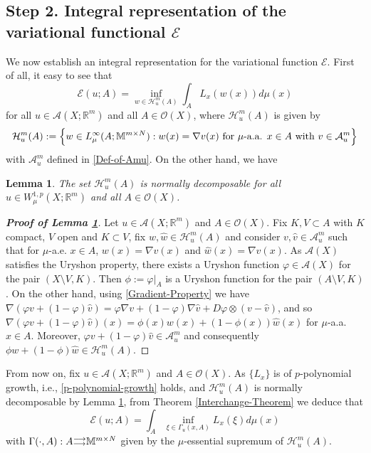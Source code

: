 \documentclass[10pt]{amsart}
\numberwithin{equation}{section}
\newtheorem{lemma}[theorem]{Lemma}
\theoremstyle{definition}
\theoremstyle{remark}
\begin{document}
\subsection*{Step 2. Integral representation of the variational functional \boldmath$\mathcal{E}$\unboldmath} We now establish an integral representation for the variational function $\mathcal{E}$. First of all, it easy to see that
$$
\mathcal{E}(u;A)=\inf_{w\in\mathcal{H}^m_u(A)}\int_AL_x(w(x))d\mu(x)
$$
for all $u\in \mathcal{A}(X;{{\mathbb R}}^m)$ and all $A\in\mathcal{O}(X)$, where $\mathcal{H}^m_u(A)$ is given by
$$
\mathcal{H}^m_u(A):=\Big\{w\in L^\infty_\mu(A;{{\mathbb M}^{m\times N}}):w(x)=\nabla v(x)\hbox{ for $\mu$-a.a. }x\in A\hbox{ with }v\in\mathcal{A}^m_u\Big\}
$$
with $\mathcal{A}^m_u$ defined in \eqref{Def-of-Amu}. On the other hand, we have
\begin{lemma}\label{Lemma2-Prop}
The set $\mathcal{H}^m_u(A)$ is normally decomposable for all $u\in W^{1,p}_\mu(X;{{\mathbb R}}^m)$ and all $A\in\mathcal{O}(X)$.
\end{lemma}
\begin{proof}[\bf Proof of Lemma \ref{Lemma2-Prop}]
Let $u\in\mathcal{A}(X;{{\mathbb R}}^m)$ and $A\in\mathcal{O}(X)$. Fix $K,V\subset A$ with $K$ compact, $V$ open and $K\subset V$, fix $w,\hat w\in\mathcal{H}^m_u(A)$ and consider $v,\hat v\in\mathcal{A}^m_u$ such that for $\mu$-a.e. $x\in A$, $w(x)=\nabla v(x)$ and $\hat w(x)=\nabla \hat v(x)$. As $\mathcal{A}(X)$ satisfies the Uryshon property, there exists a Uryshon function $\varphi\in \mathcal{A}(X)$ for the pair $(X\setminus V,K)$. Then $\phi:=\varphi|_{A}$ is a Uryshon function for the pair $(A\setminus V,K)$. On the other hand, using \eqref{Gradient-Property} we have $\nabla(\varphi v+(1-\varphi)\hat v)=\varphi\nabla v+(1-\varphi)\nabla\hat v+D\varphi\otimes(v-\hat v)$, and so $\nabla(\varphi v+(1-\varphi)\hat v)(x)=\phi(x) w(x)+(1-\phi(x))\hat w(x)$ for $\mu$-a.a. $x\in A$. Moreover, $\varphi v+(1-\varphi)\hat v\in\mathcal{A}^m_u$ and consequently $\phi w+(1-\phi)\hat w\in \mathcal{H}^m_u(A)$.
\end{proof}

\medskip

From now on, fix $u\in \mathcal{A}(X;{{\mathbb R}}^m)$ and $A\in\mathcal{O}(X)$. As $\{L_x\}$ is of $p$-polynomial growth, i.e., \eqref{p-polynomial-growth} holds, and $\mathcal{H}^m_u(A)$ is normally decomposable by Lemma \ref{Lemma2-Prop}, from Theorem \ref{Interchange-Theorem} we deduce that
\begin{equation}\label{FirsT-IntEGRAL-ReprESentation}
\mathcal{E}(u;A)=\int_A\inf_{\xi\in\Gamma_u(x,A)}L_x(\xi)d\mu(x)
\end{equation}
with $\Gamma(\cdot,A):A{{\scriptstyle\buildrel{\scriptstyle\longrightarrow}
\over{{}_{\scriptstyle\longrightarrow}}}}{{\mathbb M}^{m\times N}}$ given by the $\mu$-essential supremum of $\mathcal{H}_u^m(A)$.
\end{document}

